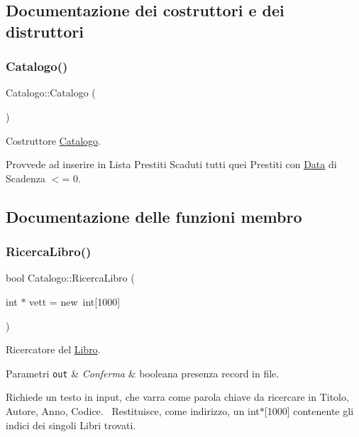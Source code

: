 \subsection{Documentazione dei costruttori e dei distruttori}
\mbox{\label{class_catalogo_af2d231942828cd6e47bdb17f4215d5d6}} 
\subsubsection{\texorpdfstring{Catalogo()}{Catalogo()}}
{\footnotesize\ttfamily Catalogo\+::\+Catalogo (\begin{DoxyParamCaption}{ }\end{DoxyParamCaption})}



Costruttore \mbox{\hyperlink{class_catalogo}{Catalogo}}. 

Provvede ad inserire in Lista Prestiti Scaduti tutti quei Prestiti con \mbox{\hyperlink{class_data}{Data}} di Scadenza $<$= 0. 

\subsection{Documentazione delle funzioni membro}
\mbox{\label{class_catalogo_a378e5b182d45ccfba3ace696656cb1d0}} 
\subsubsection{\texorpdfstring{Ricerca\+Libro()}{RicercaLibro()}}
{\footnotesize\ttfamily bool Catalogo\+::\+Ricerca\+Libro (\begin{DoxyParamCaption}\item[{int $\ast$}]{vett = {\ttfamily new~int\mbox{[}1000\mbox{]}} }\end{DoxyParamCaption})}



Ricercatore del \mbox{\hyperlink{class_libro}{Libro}}. 


\begin{DoxyParams}[1]{Parametri}
\mbox{\tt out}  & {\em Conferma} & booleana presenza record in file.\\
\hline
\end{DoxyParams}
Richiede un testo in input, che varra\textquotesingle{} come parola chiave da ricercare in Titolo, Autore, Anno, Codice.~\newline
Restituisce, come indirizzo, un int$\ast$\mbox{[}1000\mbox{]} contenente gli indici dei singoli Libri trovati. \mbox{\label{class_catalogo_a1ba3cde9c46e9d8f5bf6654c7b96647f}} 
